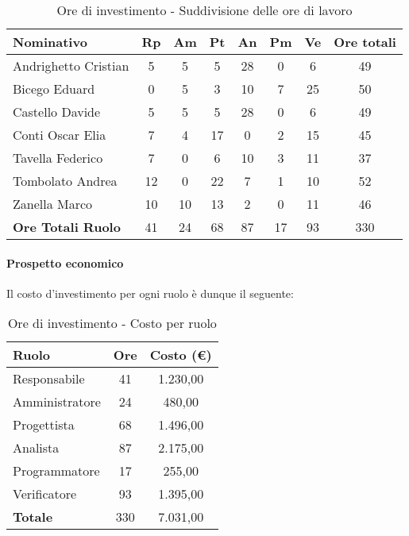 \documentclass[../PianoProgetto.tex]{subfiles}
\begin{document}
	\begin{table}[h]
		\begin{tabularx}{\textwidth}{l  * {6}{C}  c}
			\toprule
			\textbf{Nominativo} & \textbf{Rp} & \textbf{Am} & \textbf{Pt} 
						& \textbf{An} & \textbf{Pm} & \textbf{Ve} & \textbf{Ore totali} \\
			\midrule
			Andrighetto Cristian & 5 & 5 & 5 & 28 &	0 &	6 &	49 \\
			Bicego Eduard & 0 & 5 & 3 & 10 & 7 & 25 & 50 \\
			Castello Davide & 5 & 5 & 5 & 28 & 0 & 6 & 49 \\
			Conti Oscar Elia & 7 & 4 & 17 & 0 & 2 & 15 & 45 \\
			Tavella Federico &	7 & 0 & 6 & 10 & 3 & 11 & 37 \\
			Tombolato Andrea & 12 & 0 & 22 & 7 & 1 & 10 & 52 \\
			Zanella Marco & 10 & 10 & 13 & 2 & 0 & 11 & 46 \\
			\midrule			
			\textbf{Ore Totali Ruolo} & 41 & 24 & 68 & 87 & 17 & 93 & 330 \\
			\bottomrule
		\end{tabularx}
		
		\caption{Ore di investimento - Suddivisione delle ore di lavoro}
		\label{tab:investimento_ore}
		
	\end{table}
	
	
	\paragraph{Prospetto economico}
					Il costo d'investimento per ogni ruolo è dunque il seguente:
	\begin{table}[h]
		\centering
		\begin{tabular}{l * {2}{c}}
			\toprule
			\textbf{Ruolo} & \textbf{Ore} & \textbf{Costo (\euro{})} \\
			\midrule
			Responsabile &	41 &  1.230,00 \\
			Amministratore & 24 & 480,00 \\
			Progettista & 68 & 1.496,00 \\
			Analista & 87 & 2.175,00 \\
			Programmatore & 17 & 255,00 \\
			Verificatore & 93 & 1.395,00 \\
			\midrule		
			\textbf{Totale} & 330 & 7.031,00 \\
			\bottomrule
		\end{tabular}
		
		\caption{Ore di investimento - Costo per ruolo}
		\label{tab:investimento_costo}
		
	\end{table}
	
\end{document}
